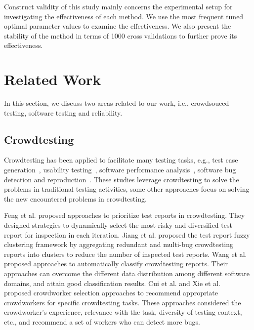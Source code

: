 \documentclass[sigconf,review, anonymous]{acmart}
\begin{document}
Construct validity of this study mainly concerns the experimental setup for investigating the effectiveness of each method. 
We use the most frequent tuned optimal parameter values to examine the effectiveness. 
We also present the stability of the method in terms of 1000 cross validations to further prove its effectiveness. 



\section{Related Work}
\label{sec:related}

In this section, we discuss two areas related to our work,
i.e., crowdsouced testing, software testing and reliability.

\subsection{Crowdtesting}
\label{subsec:related_crowdtesting}

Crowdtesting has been applied to facilitate many testing tasks, e.g.,
test case generation~\cite{chen2012puzzle}, usability testing~\cite{gomide2014affective}, software performance analysis~\cite{musson2013leveraing}, software bug detection and reproduction~\cite{maria2016reproducing}.
These studies leverage crowdtesting to solve the problems in traditional testing activities,
some other approaches focus on solving the new encountered problems in crowdtesting.

Feng et al. \cite{feng2015test,feng2016multi} proposed approaches to prioritize test reports in crowdtesting.
They designed strategies to dynamically select the most risky and diversified test report for inspection in each iteration.
Jiang et al. \cite{jiang2018fuzzy} proposed the test report fuzzy clustering framework by aggregating redundant and multi-bug crowdtesting reports into clusters to reduce the number of inspected test reports.
Wang et al.~\cite{wang2016towards,wang2016local,wang2017domain} proposed approaches to automatically classify crowdtesting reports.
Their approaches can overcome the different data distribution among different software domains, and attain good classification results.
Cui et al. \cite{cui2017who,cui2017multi} and Xie et al.~\cite{xie2017cocoon} proposed crowdworker selection approaches to recommend appropriate crowdworkers for specific crowdtesting tasks.
These approaches considered the crowdworker's experience, relevance with the task, diversity of testing context, etc., and recommend a set of workers who can detect more bugs.
\end{document}
